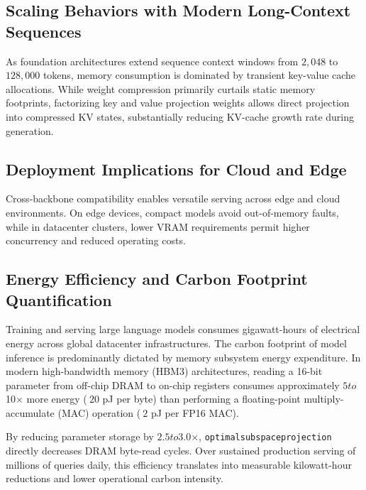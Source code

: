 \subsection{Scaling Behaviors with Modern Long-Context Sequences}
As foundation architectures extend sequence context windows from $2{,}048$ to $128{,}000$ tokens, memory consumption is dominated by transient key-value cache allocations. While weight compression primarily curtails static memory footprints, factorizing key and value projection weights allows direct projection into compressed KV states, substantially reducing KV-cache growth rate during generation.

\subsection{Deployment Implications for Cloud and Edge}
Cross-backbone compatibility enables versatile serving across edge and cloud environments. On edge devices, compact models avoid out-of-memory faults, while in datacenter clusters, lower VRAM requirements permit higher concurrency and reduced operating costs.

\subsection{Energy Efficiency and Carbon Footprint Quantification}
Training and serving large language models consumes gigawatt-hours of electrical energy across global datacenter infrastructures. The carbon footprint of model inference is predominantly dictated by memory subsystem energy expenditure. In modern high-bandwidth memory (HBM3) architectures, reading a 16-bit parameter from off-chip DRAM to on-chip registers consumes approximately $5$\times$ to $10$\times$ more energy ($~20$ pJ per byte) than performing a floating-point multiply-accumulate (MAC) operation ($~2$ pJ per FP16 MAC).

By reducing parameter storage by $2.5$\times$ to $3.0$\times$, \texttt{optimalsubspaceprojection} directly decreases DRAM byte-read cycles. Over sustained production serving of millions of queries daily, this efficiency translates into measurable kilowatt-hour reductions and lower operational carbon intensity.

